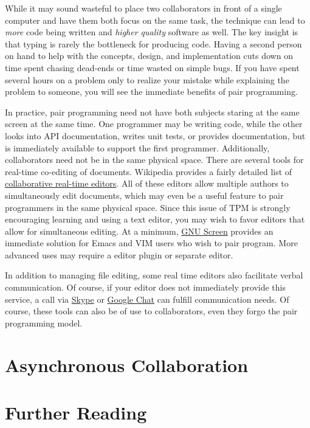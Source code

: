 \documentclass[]{article}
\begin{document}
While it may sound wasteful to place two collaborators in front of a single
computer and have them both focus on the same task, the technique can lead to
\emph{more} code being written and \emph{higher quality} software as well. The
key insight is that typing is rarely the bottleneck for producing code. Having
a second person on hand to help with the concepts, design, and implementation
cuts down on time spent chasing dead-ends or time wasted on simple bugs.
If you have spent several hours on a problem only to realize your mistake
while explaining the problem to someone, you will see the immediate benefits
of pair programming. 

In practice, pair programming need not have both subjects staring at the same
screen at the same time. One programmer may be writing code, while the other
looks into API documentation, writes unit tests, or provides documentation,
but is immediately available to support the first programmer. Additionally,
collaborators need not be in the same physical space. There are several tools
for real-time co-editing of documents. Wikipedia provides a fairly detailed
list of \href{http://en.wikipedia.org/wiki/Collaborative_real-time_editor}{collaborative real-time
editors}. All of these editors allow multiple authors to simultaneously edit
documents, which may even be a useful feature to pair programmers in the same
physical space. Since this issue of TPM is strongly encouraging learning and
using a text editor, you may wish to favor editors that allow for simultaneous
editing. At a minimum, \href{http://www.gnu.org/software/screen/}{GNU Screen}
provides an immediate solution for Emacs and VIM users who wish to pair program.
More advanced uses may require a editor plugin or separate editor.

In addition to managing file editing, some real time editors also facilitate
verbal communication. Of course, if your editor does not immediately provide
this service, a call via \href{http://www.skype.com}{Skype} or
\href{http://chat.google.com}{Google Chat} can fulfill communication needs. Of
course, these tools can also be of use to collaborators, even they forgo the
pair programming model.

\section{Asynchronous Collaboration}

\section{Further Reading}

\end{document}
